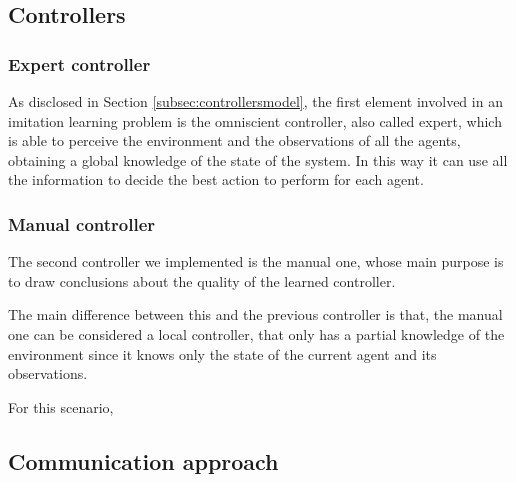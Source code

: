\subsection{Controllers}
\label{subsec:task2controllers}

\subsubsection{Expert controller}
\label{subsubsec:omniscient2}

As disclosed in Section \ref{subsec:controllersmodel}, the first element involved in 
an imitation learning problem is the omniscient controller, also called expert, 
which is able to perceive the environment and the observations of all the agents, 
obtaining a global knowledge of the state of the system. In this way it can use all 
the information to decide the best action to perform for each agent.



\subsubsection{Manual controller}
\label{subsubsec:manual2}

The second controller we implemented is the manual one, whose main 
purpose is to draw conclusions about the quality of the learned controller.

The main difference between this and the previous controller is that, the manual 
one can be considered a local controller, that only has a partial knowledge of the 
environment since it knows only the state of the current agent and its 
observations.

For this scenario,

\subsection{Communication approach}
\label{subsec:task2comm}



